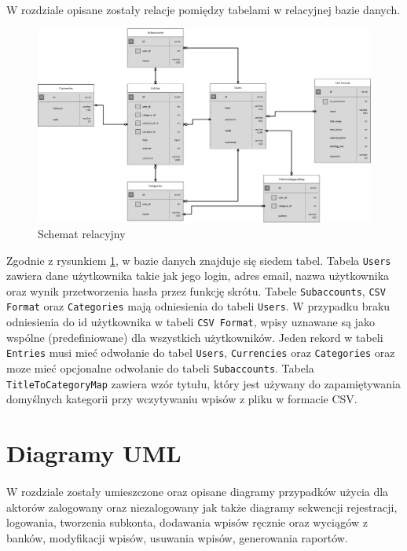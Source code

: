 \documentclass{article}
\begin{document}
	\paragraph{} W rozdziale opisane zostały relacje pomiędzy tabelami w relacyjnej bazie danych. 
	\begin{figure}[H]
		\centering
		\includegraphics[width=0.8\linewidth]{assets/er.jpg}
		\caption[]{Schemat relacyjny}
		\label{fig:er}
	\end{figure}
	
	Zgodnie z rysunkiem \ref{fig:er}, w bazie danych znajduje się siedem tabel. Tabela \texttt{Users} zawiera dane użytkownika takie jak jego login, adres email, nazwa użytkownika oraz wynik przetworzenia hasła przez funkcję skrótu. Tabele \texttt{Subaccounts}, \texttt{CSV Format} oraz \texttt{Categories} mają odniesienia do tabeli \texttt{Users}. W przypadku braku odniesienia do id użytkownika w tabeli \texttt{CSV Format}, wpisy uznawane są jako wspólne (predefiniowane) dla wszystkich użytkowników. Jeden rekord w tabeli \texttt{Entries} musi mieć odwołanie do tabel \texttt{Users}, \texttt{Currencies} oraz \texttt{Categories} oraz moze mieć opcjonalne odwołanie do tabeli \texttt{Subaccounts}. Tabela \texttt{TitleToCategoryMap} zawiera wzór tytułu, który jest używany do zapamiętywania domyślnych kategorii przy wczytywaniu wpisów z pliku w formacie CSV.
	\section{Diagramy UML}
	\paragraph*{} W rozdziale zostały umieszczone oraz opisane diagramy przypadków użycia dla aktorów zalogowany oraz niezalogowany jak także diagramy sekwencji rejestracji, logowania, tworzenia subkonta, dodawania wpisów ręcznie oraz wyciągów z banków, modyfikacji wpisów, usuwania wpisów, generowania raportów.
\end{document}
